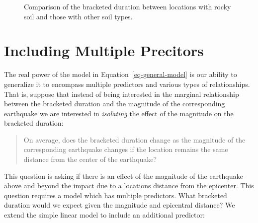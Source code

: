 \documentclass[
  letterpaper,
  DIV=11,
  numbers=noendperiod]{scrreprt}
\theoremstyle{plain}
\theoremstyle{definition}
\theoremstyle{definition}
\theoremstyle{remark}
\begin{document}
\begin{figure}


\caption{\label{fig-regextensions-ind-plot}Comparison of the bracketed
duration between locations with rocky soil and those with other soil
types.}

\end{figure}%

\section{Including Multiple
Precitors}\label{including-multiple-precitors}

The real power of the model in Equation~\ref{eq-general-model} is our
ability to generalize it to encompass multiple predictors and various
types of relationships. That is, suppose that instead of being
interested in the marginal relationship between the bracketed duration
and the magnitude of the corresponding earthquake we are interested in
\emph{isolating} the effect of the magnitude on the bracketed duration:

\begin{quote}
On average, does the bracketed duration change as the magnitude of the
corresponding earthquake changes if the location remains the same
distance from the center of the earthquake?
\end{quote}

This question is asking if there is an effect of the magnitude of the
earthquake above and beyond the impact due to a locations distance from
the epicenter. This question requires a model which has multiple
predictors. What bracketed duration would we expect given the magnitude
and epicentral distance? We extend the simple linear model to include an
additional predictor:
\end{document}
